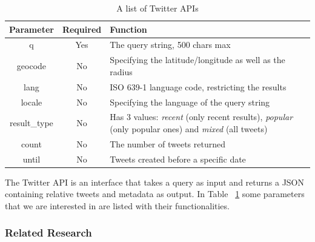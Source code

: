 \documentclass[12pt, oneside]{article}
\begin{document}
\begin{table}[h]
  \centering
  \caption{A list of Twitter APIs}
  \label{table:api}
  \begin{tabularx}{.75\textwidth}{ |c|c|X| }
    \hline
    \textbf{Parameter} & \textbf{Required} & \textbf{Function} \\
    \hline
    \hline
    q & Yes & The query string, 500 chars max \\
    \hline
    geocode & No & Specifying the latitude/longitude as well as the radius \\
    \hline
    lang & No & ISO 639-1 language code, restricting the results \\
    \hline
    locale & No & Specifying the language of the query string \\
    \hline
    result\_type & No & Has 3 values: \textit{recent} (only recent results), \textit{popular} (only popular ones) and \textit{mixed} (all tweets) \\
    \hline
    count & No & The number of tweets returned \\
    \hline
    until & No & Tweets created before a specific date \\
    \hline
  \end{tabularx}
\end{table}


The Twitter API is an interface that takes a query as input and returns a JSON containing relative tweets and metadata as output.
In Table ~\ref{table:api} some parameters that we are interested in are listed with their functionalities.

\subsubsection{Related Research}
\end{document}
